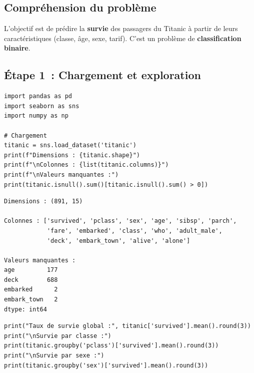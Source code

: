 
\subsection{Compr\'ehension du probl\`eme}

L'objectif est de pr\'edire la \textbf{survie} des passagers du Titanic \`a partir de leurs caract\'eristiques (classe, \^age, sexe, tarif). C'est un probl\`eme de \textbf{classification binaire}.

\subsection{\'Etape 1~: Chargement et exploration}

\begin{codeblock}[title=\textbf{Python}]
\begin{verbatim}
import pandas as pd
import seaborn as sns
import numpy as np

# Chargement
titanic = sns.load_dataset('titanic')
print(f"Dimensions : {titanic.shape}")
print(f"\nColonnes : {list(titanic.columns)}")
print(f"\nValeurs manquantes :")
print(titanic.isnull().sum()[titanic.isnull().sum() > 0])
\end{verbatim}
\end{codeblock}

\begin{codeoutput}
\begin{verbatim}
Dimensions : (891, 15)

Colonnes : ['survived', 'pclass', 'sex', 'age', 'sibsp', 'parch',
            'fare', 'embarked', 'class', 'who', 'adult_male',
            'deck', 'embark_town', 'alive', 'alone']

Valeurs manquantes :
age         177
deck        688
embarked      2
embark_town   2
dtype: int64
\end{verbatim}
\end{codeoutput}

\begin{codeblock}[title=\textbf{Python}]
\begin{verbatim}
print("Taux de survie global :", titanic['survived'].mean().round(3))
print("\nSurvie par classe :")
print(titanic.groupby('pclass')['survived'].mean().round(3))
print("\nSurvie par sexe :")
print(titanic.groupby('sex')['survived'].mean().round(3))
\end{verbatim}
\end{codeblock}

